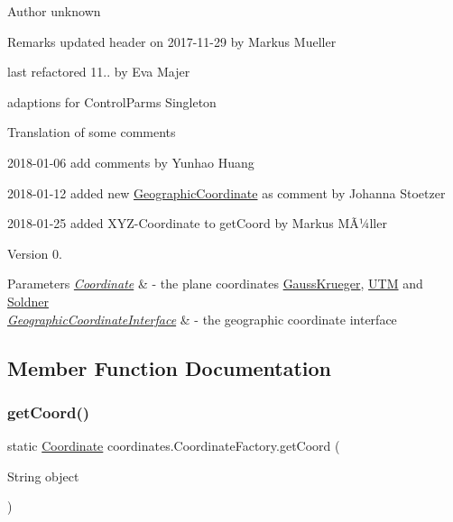 \begin{DoxyAuthor}{Author}
unknown 
\end{DoxyAuthor}
\begin{DoxyRemark}{Remarks}
updated header on 2017-\/11-\/29 by Markus Mueller 

last refactored 11.. by Eva Majer ~\newline
 
\begin{DoxyItemize}
\item adaptions for Control\+Parms Singleton 
\item Translation of some comments 
\end{DoxyItemize}

2018-\/01-\/06 add comments by Yunhao Huang 

2018-\/01-\/12 added new \hyperlink{classcoordinates_1_1_geographic_coordinate}{Geographic\+Coordinate} as comment by Johanna Stoetzer 

2018-\/01-\/25 added X\+Y\+Z-\/\+Coordinate to get\+Coord by Markus MÃ¼ller 
\end{DoxyRemark}
\begin{DoxyVersion}{Version}
0. 
\end{DoxyVersion}

\begin{DoxyParams}{Parameters}
{\em \hyperlink{classcoordinates_1_1_coordinate}{Coordinate}} & -\/ the plane coordinates \hyperlink{classcoordinates_1_1_gauss_krueger}{Gauss\+Krueger}, \hyperlink{classcoordinates_1_1_u_t_m}{U\+TM} and \hyperlink{classcoordinates_1_1_soldner}{Soldner} \\
\hline
{\em \hyperlink{classcoordinates_1_1_geographic_coordinate_interface}{Geographic\+Coordinate\+Interface}} & -\/ the geographic coordinate interface \\
\hline
\end{DoxyParams}


\subsection{Member Function Documentation}
\mbox{\label{classcoordinates_1_1_coordinate_factory_af4662c1bf4ef8b3b9c84f9a2a1e6c4d0}} 
\subsubsection{\texorpdfstring{get\+Coord()}{getCoord()}}
{\footnotesize\ttfamily static \hyperlink{classcoordinates_1_1_coordinate}{Coordinate} coordinates.\+Coordinate\+Factory.\+get\+Coord (\begin{DoxyParamCaption}\item[{String}]{object }\end{DoxyParamCaption})\hspace{0.3cm}{\ttfamily [static]}}



